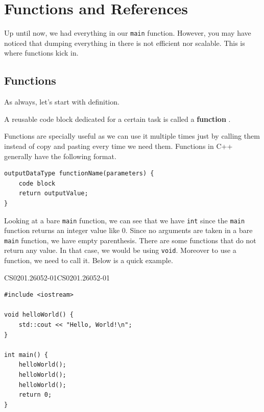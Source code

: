 \documentclass[../../main.tex]{subfiles}
\begin{document}
\section{Functions and References}

Up until now, we had everything in our \verb|main| function.
However, you may have noticed that dumping everything in there is
not efficient nor scalable. This is where functions kick in.

\subsection{Functions}

As always, let's start with definition.

\begin{definition}{}{}
A reusable code block dedicated for a certain task is called a
\textbf{function} \cite{CS02-5}.
\end{definition}

Functions are specially useful as we can use it multiple times just
by calling them instead of copy and pasting every time we need them.
Functions in C++ generally have the following format.

\begin{basicbox}
\begin{lstlisting}[style=cppstyle]
outputDataType functionName(parameters) {
    code block
    return outputValue;
}
\end{lstlisting}
\end{basicbox}

Looking at a bare \verb|main| function, we can see that we have
\verb|int| since the \verb|main| function returns an integer value
like $0$. Since no arguments are taken in a bare \verb|main| function,
we have empty parenthesis. There are some functions that do not
return any value. In that case, we would be using \verb|void|.
Moreover to use a function, we need to call it. Below is a quick
example.

\begin{cppbox}{CS0201.26052-01}{CS0201.26052-01}
\begin{lstlisting}[style=cppstyle]
#include <iostream>

void helloWorld() {
    std::cout << "Hello, World!\n";
}

int main() {
    helloWorld();
    helloWorld();
    helloWorld();
    return 0;
}
\end{lstlisting}
\end{cppbox}
\end{document}
